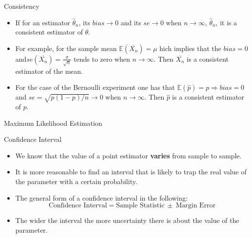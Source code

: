 \documentclass[handout]{beamer}
\begin{document}
\begin{frame}{Consistency}

\scriptsize{

\begin{itemize}
\item If for an estimator $\hat{\theta}_n$, its $bias \rightarrow 0$ and its $se \rightarrow 0$ when $n\rightarrow \infty$, $\hat{\theta}_n$, it is a consistent estimator of $\theta$.

\item For example, for the sample mean $\mathbb{E}(\overline{X_{n}})=\mu$ hich implies that the $bias =0$ and$se(\overline{X_{n}}) = \frac{\sigma}{\sqrt{n}}$  tends to zero when $n\rightarrow \infty$. Then $\overline{X_{n}}$ is a consistent estimator of the mean.  

\item For the case of the Bernoulli experiment one has that  $\mathbb{E}(\hat{p})=p \Rightarrow bias=0$ and $se = \sqrt{p(1-p)/n} \rightarrow 0$ when $n\rightarrow \infty$. Then  $\hat{p}$ is a consistent estimator of $p$.


\end{itemize}

} 
\end{frame}


\begin{frame}{Maximum Likelihood Estimation}
 
\end{frame}



\begin{frame}{Confidence Interval}
\scriptsize{
\begin{itemize}
 \item We know that the value of a point estimator \textbf{varies} from sample to sample.
 \item It is more reasonable to find an interval that is likely to trap the real value of the parameter with a certain probability.
 \item The general form of a confidence interval in the following:
  \begin{displaymath}
   \text{Confidence Interval} = \text{Sample Statistic} \ \pm \ \text{Margin Error}
  \end{displaymath}
 \item The wider the interval the more uncertainty there is about the value of the parameter.
\end{itemize}


}
 
\end{frame}
\end{document}

